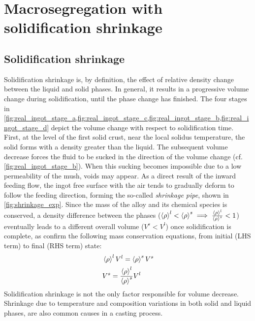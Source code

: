 \chapter{Macrosegregation with solidification shrinkage}
\begin{nolinkcolors} 
\minitoc
\end{nolinkcolors}
\newpage

\section{Solidification shrinkage}

Solidification shrinkage is, by definition, the effect of relative density change between the liquid and solid phases.
In general, it results in a progressive volume change during solidification, until the phase change has finished. 
The four stages in \cref{fig:real_ingot_stage_a,fig:real_ingot_stage_c,fig:real_ingot_stage_b,fig:real_ingot_stage_d} depict the volume change with 
respect to solidification time.
First, at the level of the first solid crust, near the local solidus temperature, the solid forms with a density greater than 
the liquid. The subsequent volume decrease forces the fluid to be sucked in the direction of the volume change 
(cf. \cref{fig:real_ingot_stage_b}). 
When this sucking becomes impossible due to a low permeability of the mush, voids may appear.
As a direct result of the inward feeding flow, the ingot free surface with the air
tends to gradually deform to follow the feeding direction, forming the so-called \emph{shrinkage pipe}, shown in \cref{fig:shrinkage_exp}. 
Since the mass of the alloy and its chemical species is conserved, 
a density difference between the phases ($\left \langle \rho \right \rangle^l < \left \langle \rho \right \rangle^s \implies \frac{\left \langle \rho \right \rangle^l}{\left \langle \rho \right \rangle^s}<1$) eventually leads 
to a different overall volume ($V^s<V^l$) once solidification is complete, as confirm the following mass conservation equations, 
from initial (LHS term) to final (RHS term) state:
\begin{subequations}
\begin{align}
& \left \langle \rho \right \rangle^l V^l = \left \langle \rho \right \rangle^s V^s  \\ 
& V^s = \frac{\left \langle \rho \right \rangle^l}{\left \langle \rho \right \rangle^s} V^l
\end{align}
\end{subequations}
Solidification shrinkage is not the only factor responsible for volume decrease. 
Shrinkage due to temperature and composition variations in both solid and liquid phases, are also common causes in a casting process. 
